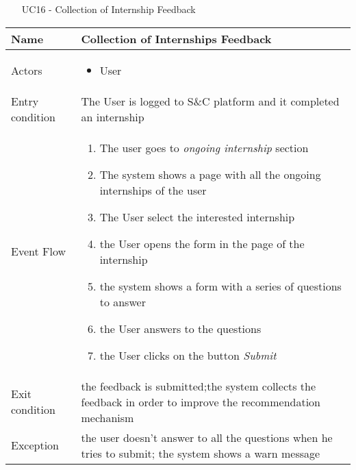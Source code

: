 						\begin{table} [H]
					\centering
					\begin{itemize}
						\item [UC16] - Collection of Internship Feedback
					\end{itemize}
					
					\begin{tabular}{|| P{7.5cm} | P{7.5cm} ||}
						\hline
						Name & Collection of Internships Feedback \\
						\hline
						Actors & \parbox{5cm}{\begin{itemize}
								\item User
							\end{itemize}
						} \\
						\hline
						Entry condition & The User is logged to S\&C platform and it completed an internship \\
						\hline
						Event Flow & \parbox{5cm}{\begin{enumerate}
								\item The user goes to \textit{ongoing internship} section
								\item The system shows a page with 
								all the ongoing internships of the user 
								\item The User select the interested 
								internship  
								\item the User opens the form in the page of the internship
								\item the system shows a form with a series of questions to answer 
								\item the User answers to the questions
								\item the User clicks on the button \textit{Submit}
						\end{enumerate}} \\
						\hline 
						Exit condition & the feedback is submitted;the system collects the
						feedback in order to improve the recommendation
						mechanism \\
						\hline
						Exception & the user doesn't answer to all the questions when he tries to submit; the system shows a warn message \\
						\hline
					\end{tabular}
				\end{table}
				
